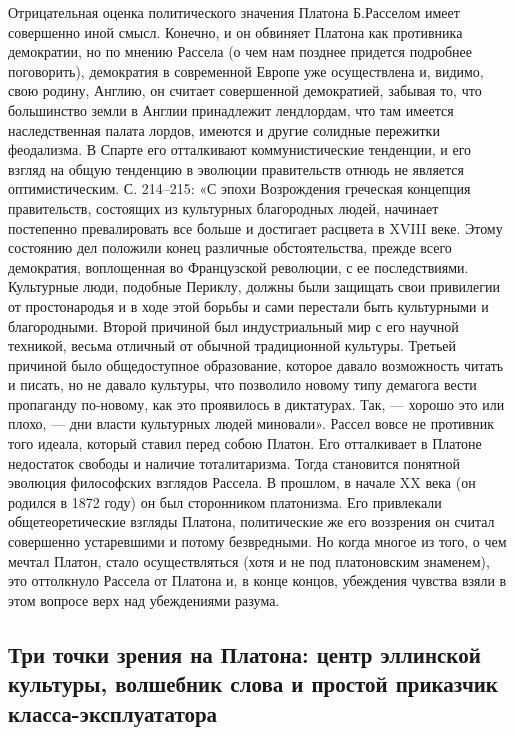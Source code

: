 Отрицательная оценка  политического значения Платона  Б.Расселом имеет
совершенно иной смысл.  Конечно, и он обвиняет  Платона как противника
демократии, но по мнению Рассела (о чем нам позднее придется подробнее
поговорить),  демократия  в  современной Европе  уже  осуществлена  и,
видимо,  свою  родину,  Англию, он  считает  совершенной  демократией,
забывая то, что большинство земли в Англии принадлежит лендлордам, что
там имеется  наследственная палата  лордов, имеются и  другие солидные
пережитки  феодализма.  В   Спарте  его  отталкивают  коммунистические
тенденции, и  его взгляд  на общую  тенденцию в  эволюции правительств
отнюдь не является оптимистическим.  С. 214--215: «С эпохи Возрождения
греческая концепция правительств,  состоящих из культурных благородных
людей,  начинает  постепенно  превалировать  все  больше  и  достигает
расцвета в  XVIII веке. Этому  состоянию дел положили  конец различные
обстоятельства,  прежде всего  демократия, воплощенная  во Французской
революции,  с ее  последствиями.  Культурные  люди, подобные  Периклу,
должны были  защищать свои привилегии  от простонародья и в  ходе этой
борьбы  и  сами  перестали  быть культурными  и  благородными.  Второй
причиной  был  индустриальный  мир  с  его  научной  техникой,  весьма
отличный  от  обычной  традиционной культуры.  Третьей  причиной  было
общедоступное образование, которое давало возможность читать и писать,
но  не  давало культуры,  что  позволило  новому типу  демагога  вести
пропаганду по-новому, как это проявилось в диктатурах. Так, --- хорошо
это или плохо, --- дни власти культурных людей миновали». Рассел вовсе
не  противник того  идеала,  который ставил  перед  собою Платон.  Его
отталкивает  в Платоне  недостаток  свободы  и наличие  тоталитаризма.
Тогда  становится понятной  эволюция философских  взглядов Рассела.  В
прошлом, в начале XX века (он  родился в 1872 году) он был сторонником
платонизма.   Его   привлекали  общетеоретические   взгляды   Платона,
политические  же  его воззрения  он  считал  совершенно устаревшими  и
потому  безвредными. Но  когда многое  из того,  о чем  мечтал Платон,
стало  осуществляться  (хотя  и  не под  платоновским  знаменем),  это
оттолкнуло Рассела  от Платона  и, в  конце концов,  убеждения чувства
взяли в этом вопросе верх над убеждениями разума.

\subsection{Три  точки зрения  на Платона:  центр эллинской  культуры,
волшебник слова и простой приказчик класса-эксплуататора}

